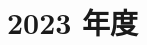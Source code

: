 \documentclass[../../hsm_tok_a.tex]{subfiles}
\begin{document}
    \section{2023 年度}

    

    \clearpage

    
\end{document}
